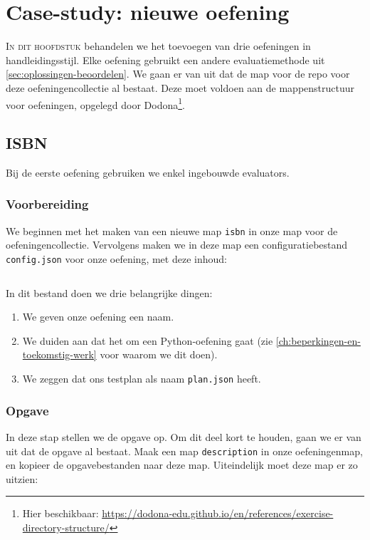 \chapter{Case-study: nieuwe oefening}\label{ch:nieuwe-oefening}

\lettrine{I}{n dit hoofdstuk} behandelen we het toevoegen van drie oefeningen in handleidingsstijl.
Elke oefening gebruikt een andere evaluatiemethode uit \cref{sec:oplossingen-beoordelen}.
We gaan er van uit dat de map voor de repo voor deze oefeningencollectie al bestaat.
Deze moet voldoen aan de mappenstructuur voor oefeningen, opgelegd door Dodona\footnote{Hier beschikbaar: \url{https://dodona-edu.github.io/en/references/exercise-directory-structure/}}.

\section{ISBN}\label{sec:isbn}

Bij de eerste oefening gebruiken we enkel ingebouwde evaluators.

\subsection{Voorbereiding}\label{subsec:voorbereiding}

We beginnen met het maken van een nieuwe map \texttt{isbn} in onze map voor de oefeningencollectie.
Vervolgens maken we in deze map een configuratiebestand \texttt{config.json} voor onze oefening, met deze inhoud:

\inputminted{json}{../../exercise/isbn/config-clean.json}

In dit bestand doen we drie belangrijke dingen:
\begin{enumerate}
    \item We geven onze oefening een naam.
    \item We duiden aan dat het om een Python-oefening gaat (zie \cref{ch:beperkingen-en-toekomstig-werk} voor waarom we dit doen).
    \item We zeggen dat ons testplan als naam \texttt{plan.json} heeft.
\end{enumerate}

\subsection{Opgave}\label{subsec:opgave}

In deze stap stellen we de opgave op.
Om dit deel kort te houden, gaan we er van uit dat de opgave al bestaat.
Maak een map \texttt{description} in onze oefeningenmap, en kopieer de opgavebestanden naar deze map.
Uiteindelijk moet deze map er zo uitzien:

